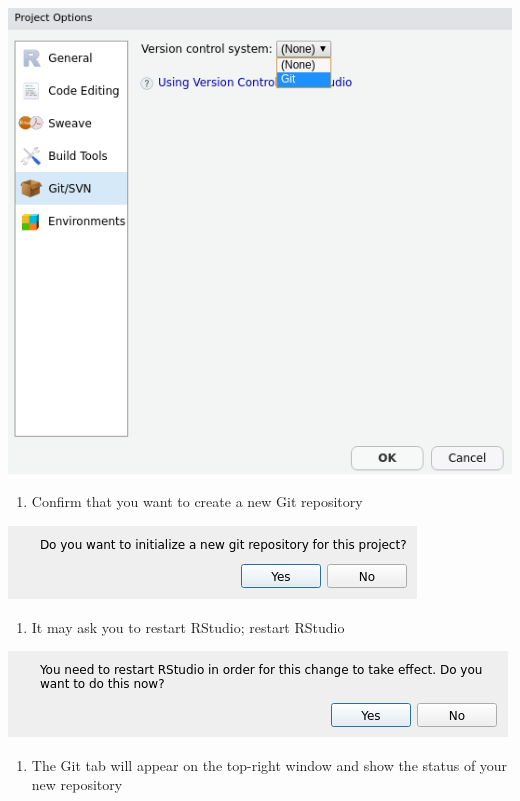 \documentclass[
]{book}
\providecommand{\tightlist}{%
  \setlength{\itemsep}{0pt}\setlength{\parskip}{0pt}}
\begin{document}
\includegraphics{images/02-newgit_3.png}

\begin{enumerate}
\def\labelenumi{\arabic{enumi}.}
\setcounter{enumi}{2}
\tightlist
\item
  Confirm that you want to create a new Git repository
\end{enumerate}

\includegraphics{images/02-newgit_4.png}

\begin{enumerate}
\def\labelenumi{\arabic{enumi}.}
\setcounter{enumi}{3}
\tightlist
\item
  It may ask you to restart RStudio; restart RStudio
\end{enumerate}

\includegraphics{images/02-newgit_5.png}

\begin{enumerate}
\def\labelenumi{\arabic{enumi}.}
\setcounter{enumi}{4}
\tightlist
\item
  The Git tab will appear on the top-right window and show the status of your new repository
\end{enumerate}
\end{document}
